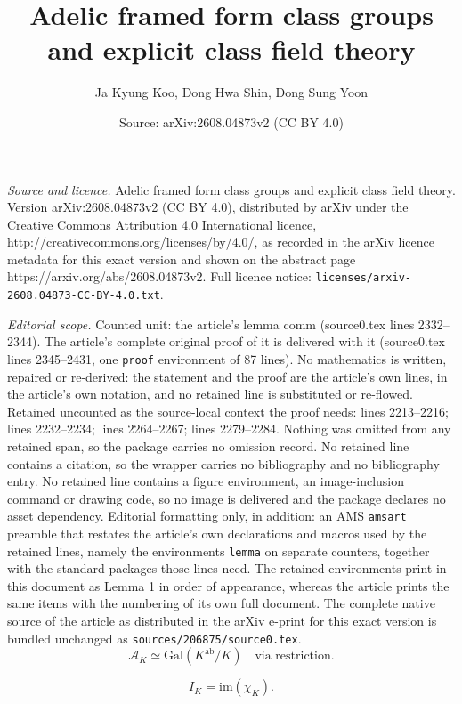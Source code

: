 \documentclass[10pt,a4paper]{amsart}
\title{Adelic framed form class groups and explicit class field theory}
\author{Ja Kyung Koo, Dong Hwa Shin, Dong Sung Yoon}
\date{Source: arXiv:2608.04873v2 (CC BY 4.0)}
\begin{document}
\maketitle

\noindent\emph{Source and licence.} Adelic framed form class groups and explicit class field theory. Version arXiv:2608.04873v2 (CC BY 4.0), distributed by arXiv under the Creative Commons Attribution 4.0 International licence, http://creativecommons.org/licenses/by/4.0/, as recorded in the arXiv licence metadata for this exact version and shown on the abstract page https://arxiv.org/abs/2608.04873v2. Full licence notice: \texttt{licenses/arxiv-2608.04873-CC-BY-4.0.txt}.\par\smallskip

\noindent\textit{Editorial scope.} Counted unit: the article's lemma comm (source0.tex lines 2332--2344). The article's complete original proof of it is delivered with it (source0.tex lines 2345--2431, one \texttt{proof} environment of 87 lines). No mathematics is written, repaired or re-derived: the statement and the proof are the article's own lines, in the article's own notation, and no retained line is substituted or re-flowed.  Retained uncounted as the source-local context the proof needs: lines 2213--2216; lines 2232--2234; lines 2264--2267; lines 2279--2284.  Nothing was omitted from any retained span, so the package carries no omission record.  No retained line contains a citation, so the wrapper carries no bibliography and no bibliography entry.  No retained line contains a figure environment, an image-inclusion command or drawing code, so no image is delivered and the package declares no asset dependency.  Editorial formatting only, in addition: an AMS \texttt{amsart} preamble that restates the article's own declarations and macros used by the retained lines, namely the environments \texttt{lemma} on separate counters, together with the standard packages those lines need.  The retained environments print in this document as Lemma 1 in order of appearance, whereas the article prints the same items with the numbering of its own full document.  The complete native source of the article as distributed in the arXiv e-print for this exact version is bundled unchanged as \texttt{sources/206875/source0.tex}.
\begin{equation}\label{AKG}
\mathcal{A}_K\simeq
\mathrm{Gal}(K^\mathrm{ab}/K)\quad\textrm{via restriction}.
\end{equation}

\begin{equation}\label{IKdef}
I_K=\mathrm{im}(\chi_K).
\end{equation}
\end{document}
